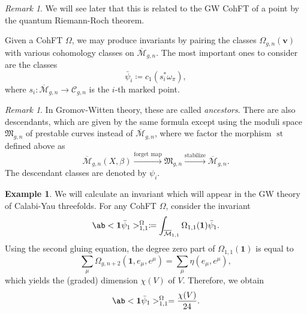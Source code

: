 \documentclass{amsart}
\theoremstyle{definition}
\newtheorem{exm}[thm]{Example}
\theoremstyle{remark}
\newtheorem{rmk}[thm]{Remark}
\theoremstyle{plain}
\theoremstyle{definition}
\theoremstyle{remark}
\newcommand{\Mbar}{\overline{\mathcal{M}}}
\newcommand{\mc}[1]{\mathcal{#1}}
\newcommand{\mf}[1]{\mathfrak{#1}}
\newcommand{\mbf}[1]{\mathbf{#1}}
\newcommand{\bv}{\mbf{v}}
\newcommand{\1}{\mathbf{1}}
\newcommand{\2}{\mathbf{2}}
\newcommand{\3}{\mathbf{3}}
\DeclareMathOperator{\st}{st}
\begin{document}
\begin{rmk}
    We will see later that this is related to the GW CohFT of a point by the quantum Riemann-Roch theorem. 
\end{rmk}

Given a CohFT $\Omega$, we may produce invariants by pairing the classes $\Omega_{g,n}(\bv)$ with various cohomology classes on $\Mbar_{g,n}$. The most important ones to consider are the classes
\[ \bar{\psi}_i \coloneqq c_1( s_i^* \omega_{\pi} ), \]
where $s_i \colon \Mbar_{g,n} \to \mc{C}_{g,n}$ is the $i$-th marked point.

\begin{rmk}
    In Gromov-Witten theory, these are called \textit{ancestors}. There are also descendants, which are given by the same formula except using the moduli space $\mf{M}_{g,n}$ of prestable curves instead of $\Mbar_{g,n}$, where we factor the morphism $\st$ defined above as
    \[ \Mbar_{g,n}(X,\beta) \xrightarrow{\text{forget map}} \mf{M}_{g,n} \xrightarrow{\text{stabilize}} \Mbar_{g,n}. \]
    The descendant classes are denoted by $\psi_i$.
\end{rmk}

\begin{exm}
    We will calculate an invariant which will appear in the GW theory of Calabi-Yau threefolds. For any CohFT $\Omega$, consider the invariant
    \[ \ab<\1\bar{\psi}_1>_{1,1}^{\Omega}\coloneqq \int_{\Mbar_{1,1}} \Omega_{1,1}(\1)\bar{\psi}_1. \]
    Using the second gluing equation, the degree zero part of $\Omega_{1,1}(\1)$ is equal to
    \[ \sum_{\mu} \Omega_{g,n+2}(\1, e_{\mu}, e^{\mu}) = \sum_{\mu} \eta(e_{\mu}, e^{\mu}), \]
    which yields the (graded) dimension $\chi(V)$ of $V$. Therefore, we obtain
    \[ \ab<\1\bar{\psi}_1>_{1,1}^{\Omega} = \frac{\chi(V)}{24}. \]
\end{exm}
\end{document}
